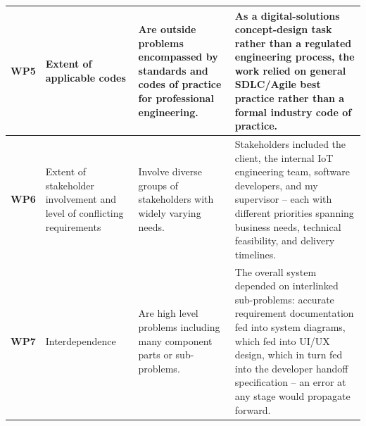 \begin{longtable}[H]{|p{1.5cm}|p{4cm}|p{4cm}|p{4cm}|}
\textbf{WP5} &
Extent of applicable codes &
Are outside problems encompassed by standards and codes of practice for professional engineering. &
As a digital-solutions concept-design task rather than a regulated engineering process, the work relied on general SDLC/Agile best practice rather than a formal industry code of practice. \\
\hline

\textbf{WP6} &
Extent of stakeholder involvement and level of conflicting requirements &
Involve diverse groups of stakeholders with widely varying needs. &
Stakeholders included the client, the internal IoT engineering team, software developers, and my supervisor -- each with different priorities spanning business needs, technical feasibility, and delivery timelines. \\
\hline

\textbf{WP7} &
Interdependence &
Are high level problems including many component parts or sub-problems. &
The overall system depended on interlinked sub-problems: accurate requirement documentation fed into system diagrams, which fed into UI/UX design, which in turn fed into the developer handoff specification -- an error at any stage would propagate forward. \\
\hline

\end{longtable}

\newpage


